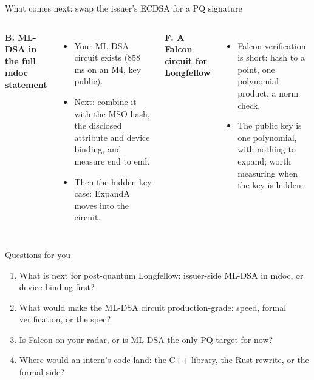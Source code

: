 \documentclass[aspectratio=169,11pt]{beamer}
\begin{document}
\begin{frame}{What comes next: swap the issuer's ECDSA for a PQ signature}
\centering
{}
\vspace{.5em}
\begin{columns}[T]
\textbf{B. ML-DSA in the full mdoc statement}
\begin{itemize}\footnotesize
  \item Your ML-DSA circuit exists (858\,ms on an M4, key public).
  \item Next: combine it with the MSO hash, the disclosed attribute and device binding,
        and measure end to end.
  \item Then the hidden-key case: ExpandA moves into the circuit.
\end{itemize}
\textbf{F. A Falcon circuit for Longfellow}
\begin{itemize}\footnotesize
  \item Falcon verification is short: hash to a point, one polynomial product, a norm check.
  \item The public key is one polynomial, with nothing to expand; worth measuring when the key is hidden.
\end{itemize}
\end{columns}
\end{frame}

\begin{frame}{Questions for you}
\begin{enumerate}
  \item What is next for post-quantum Longfellow: issuer-side ML-DSA in mdoc, or device binding first?
  \item What would make the ML-DSA circuit production-grade: speed, formal verification, or the spec?
  \item Is Falcon on your radar, or is ML-DSA the only PQ target for now?
  \item Where would an intern's code land: the C++ library, the Rust rewrite, or the formal side?
\end{enumerate}
\end{frame}
\end{document}
